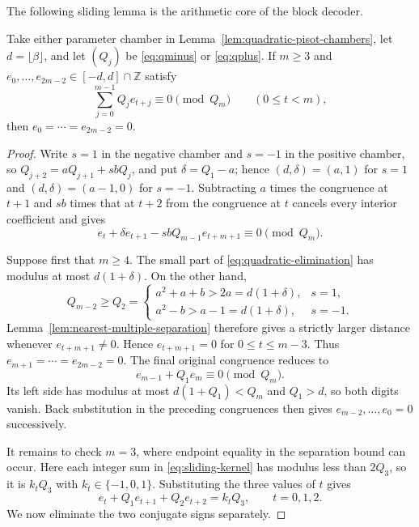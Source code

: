 The following sliding lemma is the arithmetic core of the block decoder.

\begin{lemma}
\label{lem:quadratic-sliding-congruences}
Take either parameter chamber in
Lemma~\ref{lem:quadratic-pisot-chambers}, let $d=\lfloor\beta\rfloor$, and
let $(Q_j)$ be \eqref{eq:qminus} or \eqref{eq:qplus}.  If $m\ge3$ and
$e_0,\ldots,e_{2m-2}\in[-d,d]\cap\mathbb Z$ satisfy
\begin{equation}
\sum_{j=0}^{m-1}Q_j e_{t+j}\equiv0\pmod{Q_m}
\qquad(0\le t<m),\label{eq:sliding-kernel}
\end{equation}
then $e_0=\cdots=e_{2m-2}=0$.
\end{lemma}

\begin{proof}
Write $s=1$ in the negative chamber and $s=-1$ in the positive chamber, so
$Q_{j+2}=aQ_{j+1}+sbQ_j$, and put
$\delta=Q_1-a$; hence $(d,\delta)=(a,1)$ for $s=1$ and
$(d,\delta)=(a-1,0)$ for $s=-1$.  Subtracting $a$ times the congruence at
$t+1$ and $sb$ times that at $t+2$ from the congruence at $t$ cancels every
interior coefficient and gives
\begin{equation}
e_t+\delta e_{t+1}-sbQ_{m-1}e_{t+m+1}\equiv0\pmod{Q_m}.
\label{eq:quadratic-elimination}
\end{equation}

Suppose first that $m\ge4$.  The small part of
\eqref{eq:quadratic-elimination} has modulus at most
$d(1+\delta)$.  On the other hand,
\[
Q_{m-2}\ge Q_2=
\begin{cases}
a^2+a+b>2a=d(1+\delta),&s=1,\\
a^2-b>a-1=d(1+\delta),&s=-1.
\end{cases}
\]
Lemma~\ref{lem:nearest-multiple-separation} therefore gives a strictly larger
distance whenever $e_{t+m+1}\ne0$.  Hence
$e_{t+m+1}=0$ for $0\le t\le m-3$.  Thus
$e_{m+1}=\cdots=e_{2m-2}=0$.  The final original congruence reduces to
\[
e_{m-1}+Q_1e_m\equiv0\pmod{Q_m}.
\]
Its left side has modulus at most $d(1+Q_1)<Q_m$ and $Q_1>d$, so both
digits vanish.  Back substitution in the preceding congruences then gives
$e_{m-2},\ldots,e_0=0$ successively.

It remains to check $m=3$, where endpoint equality in the separation bound
can occur.  Here each integer sum in \eqref{eq:sliding-kernel} has modulus
less than $2Q_3$, so it is $k_tQ_3$ with $k_t\in\{-1,0,1\}$.  Substituting
the three values of $t$ gives
\begin{equation}
e_t+Q_1e_{t+1}+Q_2e_{t+2}=k_tQ_3,
\qquad t=0,1,2.
\label{eq:quadratic-m3-equalities}
\end{equation}
We now eliminate the two conjugate signs separately.


\end{proof}
